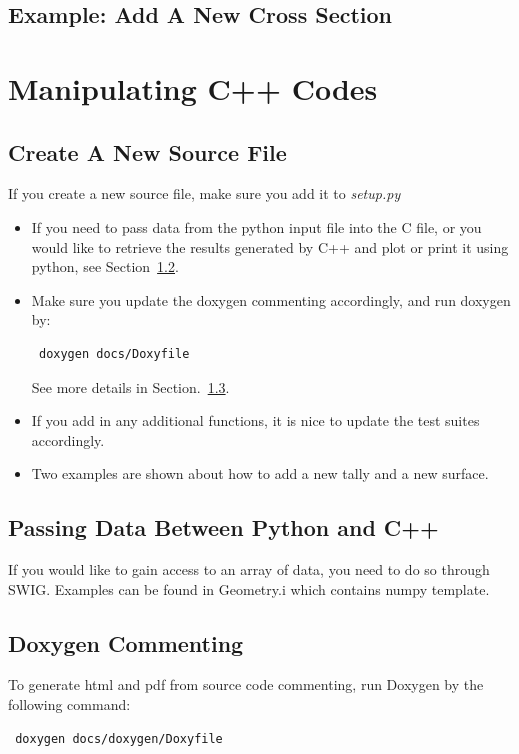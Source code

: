 \documentclass[titlepage]{article}
\begin{document}
\clearpage
\subsection{Example: Add A New Cross Section}







\clearpage
\section{Manipulating C++ Codes}
\subsection{Create A New Source File}
If you create a new source file, make sure you add it to \textit{setup.py}

\begin{itemize}
\item If you need to pass data from the python input file into the C file, or you would like to retrieve the results generated by C++ and plot or print it using python, see Section~\ref{data}. 
\item Make sure you update the doxygen commenting accordingly, and run doxygen by:
\begin{verbatim}
 doxygen docs/Doxyfile
\end{verbatim}
See more details in Section.~\ref{doxygen}. 

\item If you add in any additional functions, it is nice to update the test suites accordingly. 

\item Two examples are shown about how to add a new tally and a new surface. 
\end{itemize}

\subsection{Passing Data Between Python and C++} \label{data}
If you would like to gain access to an array of data, you need to do so through SWIG. Examples can be found in Geometry.i which contains numpy template. 


\subsection{Doxygen Commenting} \label{doxygen}
To generate html and pdf from source code commenting, run Doxygen by the following command:
\begin{verbatim}
 doxygen docs/doxygen/Doxyfile
\end{verbatim}
\end{document}
